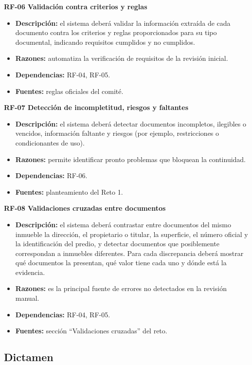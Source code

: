 \documentclass[11pt, a4paper]{article}
\begin{document}
\textbf{RF-06 Validación contra criterios y reglas}
\begin{itemize}
    \item \textbf{Descripción:} el sistema deberá validar la información extraída de cada documento contra los criterios y reglas proporcionados para su tipo documental, indicando requisitos cumplidos y no cumplidos.
    \item \textbf{Razones:} automatiza la verificación de requisitos de la revisión inicial.
    \item \textbf{Dependencias:} RF-04, RF-05.
    \item \textbf{Fuentes:} reglas oficiales del comité.
\end{itemize}

\textbf{RF-07 Detección de incompletitud, riesgos y faltantes}
\begin{itemize}
    \item \textbf{Descripción:} el sistema deberá detectar documentos incompletos, ilegibles o vencidos, información faltante y riesgos (por ejemplo, restricciones o condicionantes de uso).
    \item \textbf{Razones:} permite identificar pronto problemas que bloquean la continuidad.
    \item \textbf{Dependencias:} RF-06.
    \item \textbf{Fuentes:} planteamiento del Reto 1.
\end{itemize}

\textbf{RF-08 Validaciones cruzadas entre documentos}
\begin{itemize}
    \item \textbf{Descripción:} el sistema deberá contrastar entre documentos del mismo inmueble la dirección, el propietario o titular, la superficie, el número oficial y la identificación del predio, y detectar documentos que posiblemente correspondan a inmuebles diferentes. Para cada discrepancia deberá mostrar qué documentos la presentan, qué valor tiene cada uno y dónde está la evidencia.
    \item \textbf{Razones:} es la principal fuente de errores no detectados en la revisión manual.
    \item \textbf{Dependencias:} RF-04, RF-05.
    \item \textbf{Fuentes:} sección ``Validaciones cruzadas'' del reto.
\end{itemize}

\subsection*{Dictamen}
\end{document}
